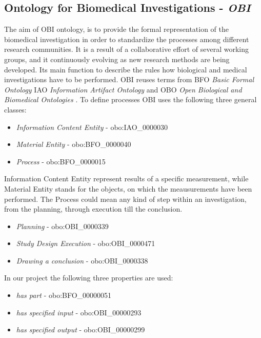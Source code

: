 \subsection{Ontology for Biomedical Investigations - \textit{OBI}} \label{obi}


The aim of OBI ontology, is to provide the formal representation of the biomedical investigation in order to standardize the processes among different research communities. It is a result of a collaborative effort of several working groups, and it continuously evolving as new research methods are being developed. Its main function to describe the rules how biological and medical investigations have to be performed. OBI reuses terms from BFO \textit{Basic Formal Ontology} IAO \textit{Information Artifact Ontology} and  OBO \textit{Open Biological and Biomedical Ontologies} \cite{10.1371/journal.pone.0154556}. To define processes OBI uses the following three general classes:

\begin{itemize}
	\item  \textit{Information Content Entity} - obo:IAO\_0000030
	\item  \textit{Material Entity} - obo:BFO\_0000040
	\item  \textit{Process} - obo:BFO\_0000015
\end{itemize}

Information Content Entity represent results of a specific measurement, while Material Entity stands for the objects, on which the meausurements have been performed. 
The Process could mean any kind of step within an investigation, from the planning, through execution till the conclusion.

\begin{itemize}
	\item  \textit{Planning} - obo:OBI\_0000339
	\item  \textit{Study Design Execution} - obo:OBI\_0000471
	\item  \textit{Drawing a conclusion} - obo:OBI\_0000338
\end{itemize}


In our project the following three properties are used:

\begin{itemize}
	\item  \textit{has part} - obo:BFO\_00000051
	\item  \textit{has specified input} - obo:OBI\_00000293
	\item  \textit{has specified output} - obo:OBI\_00000299
\end{itemize}


